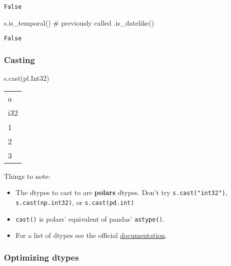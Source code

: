 \documentclass[
  letterpaper,
  DIV=11,
  numbers=noendperiod]{scrartcl}
\newenvironment{Shaded}{\begin{snugshade}}{\end{snugshade}}
\newcommand{\CommentTok}[1]{\textcolor[rgb]{0.37,0.37,0.37}{#1}}
\newcommand{\NormalTok}[1]{\textcolor[rgb]{0.00,0.23,0.31}{#1}}
\providecommand{\tightlist}{%
  \setlength{\itemsep}{0pt}\setlength{\parskip}{0pt}}\usepackage{longtable,booktabs,array}
\begin{document}
\begin{verbatim}
False
\end{verbatim}

\begin{Shaded}
\begin{Highlighting}[]
\NormalTok{s.is\_temporal() }\CommentTok{\# previously called .is\_datelike()}
\end{Highlighting}
\end{Shaded}

\begin{verbatim}
False
\end{verbatim}

\hypertarget{casting}{%
\subsubsection{Casting}\label{casting}}

\begin{Shaded}
\begin{Highlighting}[]
\NormalTok{s.cast(pl.Int32)}
\end{Highlighting}
\end{Shaded}

\begin{longtable}[]{@{}l@{}}
\toprule()
a \\
i32 \\
\midrule()
\endhead
1 \\
2 \\
3 \\
\bottomrule()
\end{longtable}

Things to note:

\begin{itemize}
\tightlist
\item
  The dtypes to cast to are \textbf{polars} dtypes. Don't try
  \texttt{s.cast("int32")}, \texttt{s.cast(np.int32)}, or
  \texttt{s.cast(pd.int)}
\item
  \texttt{cast()} is polars' equivalent of pandas' \texttt{astype()}.
\item
  For a list of dtypes see the official
  \href{see\%20https://pola-rs.github.io/polars/py-polars/html/reference/datatypes.html}{documentation}.
\end{itemize}

\hypertarget{optimizing-dtypes}{%
\subsubsection{Optimizing dtypes}\label{optimizing-dtypes}}
\end{document}
